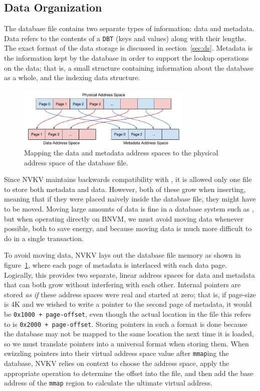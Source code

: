 \subsection{Data Organization}

The database file contains two separate types of information: data and metadata. Data
refers to the contents of a \texttt{DBT} (keys and values) along with their
lengths. The exact format of the data storage is discussed in
section~\ref{sec:ds}. Metadata is the information kept by the database in order
to support the lookup operations on the data; that is, a small structure
containing information about the database as a whole, and the indexing data
structure.

\begin{figure}
\centering
\hspace*{-0.1in}
\includegraphics[width=84mm]{fig/addrspace}
\caption{Mapping the data and metadata address spaces to the physical address
space of the database file.}
\label{fig:addrspace}
\end{figure}

Since NVKV maintains backwards compatibility with \bdb, it is allowed only one file to
store both metadata and data. However, both of these grow when inserting,
meaning that if they were placed naively inside the database file, they might
have to be moved. Moving large amounts of data is fine in a database system
such as \bdb, but when operating directly on BNVM, we must avoid moving data
whenever possible, both to save energy, and because moving data is much more
difficult to do in a single transaction.

To avoid moving data, NVKV lays out the database file memory as shown in
figure~\ref{fig:addrspace}, where each page of metadata is interlaced with each
data page. Logically, this provides two separate, linear address spaces for data
and metadata that can both grow without interfering with each other. Internal pointers are stored \textit{as if} these address spaces
were real and started at zero; that is, if page-size is 4K and we wished to
write a pointer to the second page of metadata, it would be \texttt{0x1000 +
page-offset}, even though the actual location in the file this refers to is
\texttt{0x2000 + page-offset}. Storing pointers in such a format is done because
the database may not be mapped to the same location the next time it is loaded,
so we must translate pointers into a universal format when storing them.
When swizzling pointers into their virtual
address space value after \texttt{mmap}ing the database, NVKV relies on context
to choose the address space, apply the appropriate operation to determine the
offset into the file, and then add the base address of the \texttt{mmap}
region to calculate the ultimate virtual address.

